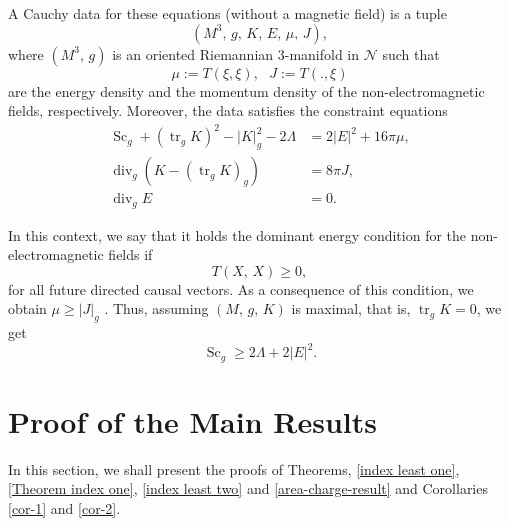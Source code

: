 \documentclass[a4paper, 11pt, reqno]{amsart}
\newcommand{\tr}{\operatorname{tr}}
\newcommand{\diver}{\operatorname{div}}
\newcommand{\s}{\operatorname{Sc}}
\begin{document}
A Cauchy data for these equations (without a magnetic field) is a tuple
\begin{equation*}
    (M^3,\,g,\,K,\,E,\,\mu,\,J),
\end{equation*}
where $(M^3,\,g)$ is an oriented Riemannian $3$-manifold in $\mathcal{N}$ such that 
$$\mu:= T(\xi,\xi),\,\,\,\, J:=T(.,\xi)$$
are the energy density and the momentum density of the non-electromagnetic fields, respectively. Moreover, the data satisfies the constraint equations
\begin{align*}
\s_{g}+(\tr_gK)^2-|K|_g^2-2\Lambda &=2|E|^2+16\pi\mu,\\
\diver_{g}(K-(\tr_gK)_g) &=8\pi J,\\
\diver_{g}E &=0.
\end{align*} 

In this context, we say that it holds the dominant energy condition for the non-electromagnetic fields if \cite[Section 2]{DGC}
\begin{equation*}
    T(X,\,X)\geq 0,
\end{equation*}
for all future directed causal vectors. As a consequence of this condition, we obtain $\mu\geq |J|_g$ \cite[Section 8.3.4]{G}. Thus, assuming $(M,\,g,\,K)$ is maximal, that is, $\tr_gK=0$, we get 
\begin{equation*}
    \s_g\geq 2\Lambda+2|E|^2.
\end{equation*}



\section{Proof of the Main Results}\label{ME}
In this section, we shall present the proofs of Theorems, \ref{index least one}, \ref{Theorem index one}, \ref{index least two} and \ref{area-charge-result} and Corollaries \ref{cor-1} and \ref{cor-2}.
\end{document}

